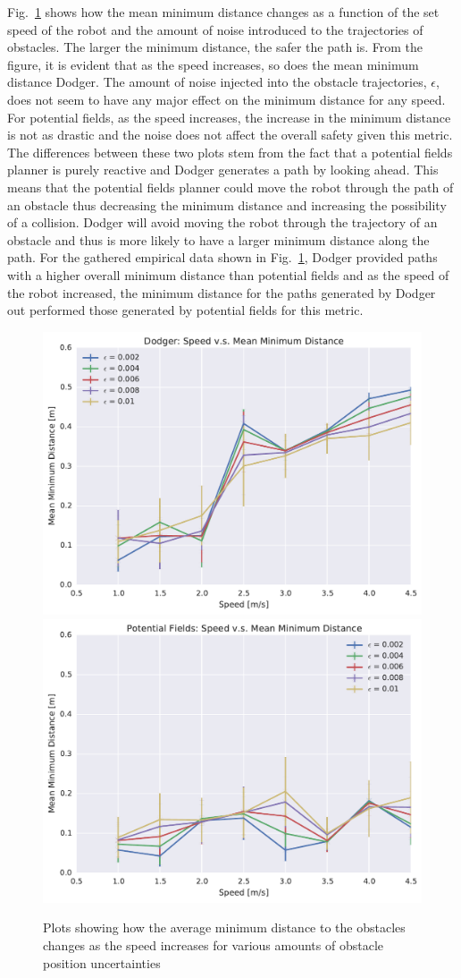 Fig.~\ref{fig:plot_min_distance} shows how the mean minimum distance changes as
a function of the set speed of the robot and the amount of noise introduced to
the trajectories of obstacles. The larger the minimum distance, the safer the
path is. From the figure, it is evident that as the speed increases, so does
the mean minimum distance Dodger. The amount of noise injected into the
obstacle trajectories, $\epsilon$, does not seem to have any major effect on
the minimum distance for any speed. For potential fields, as the speed
increases, the increase in the minimum distance is not as drastic and the noise
does not affect the overall safety given this metric. The differences between
these two plots stem from the fact that a potential fields planner is purely
reactive and Dodger generates a path by looking ahead. This means that the
potential fields planner could move the robot through the path of an obstacle
thus decreasing the minimum distance and increasing the possibility of a
collision. Dodger will avoid moving the robot through the trajectory of an
obstacle and thus is more likely to have a larger minimum distance along the
path. For the gathered empirical data shown in
Fig.~\ref{fig:plot_min_distance}, Dodger provided paths with a higher overall
minimum distance than potential fields and as the speed of the robot increased,
the minimum distance for the paths generated by Dodger out performed those
generated by potential fields for this metric.

\begin{figure}[h!]
    \centering
    \includegraphics[width=0.48\linewidth]{figs/planner_mean_min_distance_0}
    \includegraphics[width=0.48\linewidth]{figs/pf_mean_min_distance_0}
    \caption{Plots showing how the average minimum distance to the obstacles
    changes as the speed increases for various amounts of obstacle position
    uncertainties}
    \label{fig:plot_min_distance}
\end{figure}

